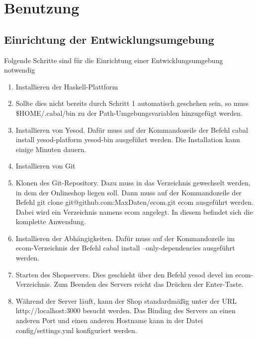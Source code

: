 \chapter{Benutzung}

\section{Einrichtung der Entwicklungsumgebung}
Folgende Schritte sind für die Einrichtung einer Entwicklungsumgebung notwendig

\begin{enumerate}
  \item Installieren der Haskell-Plattform \cite{HasP}
  \vspace*{-0.5em}
  \item Sollte dies nicht bereits durch Schritt 1 automatisch geschehen sein, so muss \textsf{\$HOME/.cabal/bin} zu der \textsf{Path}-Umgebungsvariablen hinzugefügt werden.
  \vspace*{-0.5em}
  \item Installieren von Yesod. Dafür muss auf der Kommandozeile der Befehl \textsf{cabal install yesod-platform yesod-bin} ausgeführt werden. Die Installation kann einige Minuten dauern. 
  \vspace*{-0.5em}
  \item Installieren von Git \cite{GitIn}
  \vspace*{-0.5em}
  \item Klonen des Git-Repository. Dazu muss in das Verzeichnis gewechselt werden, in dem der Onlineshop liegen soll. Dann muss auf der Kommandozeile der Befehl \textsf{git clone git@github.com:MaxDaten/ecom.git ecom} ausgeführt werden. Dabei wird ein Verzeichnis namens \textsf{ecom} angelegt. In diesem befindet sich die komplette Anwendung.
  \vspace*{-0.5em}
  \item Installieren der Abhängigkeiten. Dafür muss auf der Kommandozeile im \textsf{ecom}-Verzeichnis der Befehl \textsf{cabal install --only-dependencies} ausgeführt werden.
  \vspace*{-0.5em}
  \item Starten des Shopservers. Dies geschieht über den Befehl \textsf{yesod devel} im \textsf{ecom}-Verzeichnis. Zum Beenden des Servers reicht das Drücken der Enter-Taste. 
  \vspace*{-0.5em}
  \item Während der Server läuft, kann der Shop standardmäßig unter der URL \\ \textsf{http://localhost:3000} besucht werden. Das Binding des Servers an einen anderen Port und einen anderen Hostname kann in der Datei \textsf{config/settings.yml} konfiguriert werden.
\end{enumerate}

